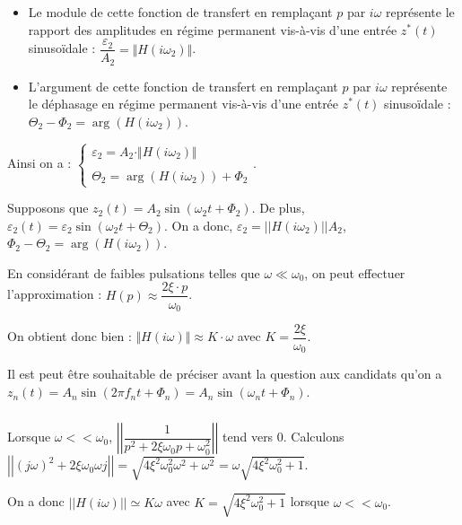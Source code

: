 \documentclass[10pt,fleqn]{article} %
\begin{document}
\begin{itemize}
\item Le module de cette fonction de transfert en remplaçant $p$ par $i\omega$ représente le rapport des amplitudes en régime permanent vis-à-vis d'une entrée $z^*(t)$ sinusoïdale : 
$
\dfrac{\varepsilon_2}{A_2}=\Vert H(i\omega_2)\Vert
$.
\item L'argument de cette fonction de transfert en remplaçant $p$ par $i\omega$ représente le déphasage en régime permanent vis-à-vis d'une entrée $z^*(t)$ sinusoïdale : 
$
\Theta_2-\Phi_2=\arg\left(H(i\omega_2)\right)
$.
\end{itemize}

Ainsi on a : 
$
\left\{
\begin{array}{c}
\varepsilon_2=A_2\cdot \Vert H(i\omega_2)\Vert\\
\\
\Theta_2=\arg\left(H(i\omega_2)\right)+\Phi_2
\end{array}
\right.
$.


Supposons que  $z_2(t)=A_2\sin \left(\omega_2 t + \Phi_2 \right)$. De plus, $\varepsilon_2(t)=\varepsilon_2 \sin \left( \omega_2 t + \Theta_2 \right)$. On a donc, $\varepsilon_2 = || H\left( i\omega_2\right)|| A_2$, $\Phi_2 - \Theta_2 = \arg \left(H\left(i\omega_2\right)\right)$.




En considérant de faibles pulsations telles que $\omega\ll \omega_0$, on peut effectuer l'approximation : 
$H(p)\approx \dfrac{2\xi\cdot p}{\omega_0}$.

On obtient donc bien : $\Vert H(i\omega)\Vert\approx K\cdot \omega $  avec $K=\dfrac{2\xi}{\omega_0}$.


\begin{remarque}
Il est peut être souhaitable de préciser avant la question aux candidats qu'on a $z_n(t)=A_n\sin \left(2\pi f_n t + \Phi_n \right)=A_n\sin \left(\omega_n t + \Phi_n \right)$. 
\end{remarque}

\subparagraph{}	 %
Lorsque $\omega << \omega_0$, $\left|\left|  \dfrac{1}{p^2+2\xi\omega_0 p + \omega_0^2} \right|\right|$ tend vers 0. Calculons $\left|\left|  \left( j \omega \right) ^2+2\xi\omega_0  \omega j  \right|\right| =\sqrt{4\xi^2\omega_0^2 \omega^2 + \omega^2} =\omega \sqrt{4\xi^2\omega_0^2  + 1}$. 

On a donc $|| H\left( i\omega\right)|| \simeq K\omega $ avec $K=\sqrt{4\xi^2\omega_0^2  + 1}$ lorsque $\omega << \omega_0$.
\end{document}
